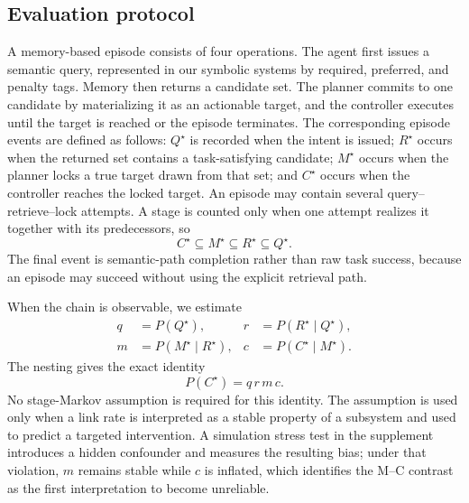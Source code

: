 \documentclass[letterpaper]{article} %
\begin{document}
\subsection{Evaluation protocol}
\label{sec:protocol}

A memory-based episode consists of four operations. The agent first issues a semantic query, represented in our symbolic systems by required, preferred, and penalty tags. Memory then returns a candidate set. The planner commits to one candidate by materializing it as an actionable target, and the controller executes until the target is reached or the episode terminates. The corresponding episode events are defined as follows: $Q^\star$ is recorded when the intent is issued; $R^\star$ occurs when the returned set contains a task-satisfying candidate; $M^\star$ occurs when the planner locks a true target drawn from that set; and $C^\star$ occurs when the controller reaches the locked target. An episode may contain several query--retrieve--lock attempts. A stage is counted only when one attempt realizes it together with its predecessors, so
\begin{equation}
C^\star \subseteq M^\star \subseteq R^\star \subseteq Q^\star.
\end{equation}
The final event is semantic-path completion rather than raw task success, because an episode may succeed without using the explicit retrieval path.

When the chain is observable, we estimate
\begin{equation}
\begin{aligned}
q&=P(Q^\star), & r&=P(R^\star\mid Q^\star),\\
m&=P(M^\star\mid R^\star), & c&=P(C^\star\mid M^\star).
\end{aligned}
\end{equation}
The nesting gives the exact identity
\begin{equation}
P(C^\star)=q\,r\,m\,c.
\end{equation}
No stage-Markov assumption is required for this identity. The assumption is used only when a link rate is interpreted as a stable property of a subsystem and used to predict a targeted intervention. A simulation stress test in the supplement introduces a hidden confounder and measures the resulting bias; under that violation, $m$ remains stable while $c$ is inflated, which identifies the M--C contrast as the first interpretation to become unreliable.
\end{document}
